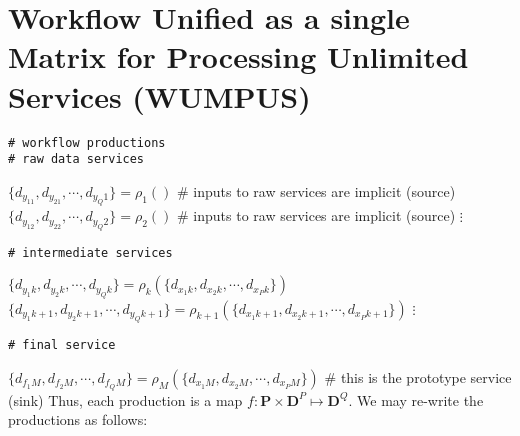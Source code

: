 \documentclass{article}[11pt]
\begin{document}
\section{Workflow Unified as a single Matrix for Processing Unlimited Services (WUMPUS)}
%
%
\begin{verbatim}
# workflow productions
# raw data services
\end{verbatim}
$\{d_{y_11}, d_{y_21}, \cdots, d_{y_Q1}\} = \rho_{1}\left(\right)$ \# inputs to raw services are implicit (source)
\newline
$\{d_{y_12}, d_{y_22}, \cdots, d_{y_Q2}\} = \rho_{2}\left(\right)$ \# inputs to raw services are implicit (source)
\newline
$\vdots$
\begin{verbatim}
# intermediate services
\end{verbatim}
$\{d_{y_1k}, d_{y_2k}, \cdots, d_{y_Qk}\} = \rho_{k}\left(\{d_{x_1k}, d_{x_2k}, \cdots, d_{x_Pk}\}\right)$ 
\newline
$\{d_{y_1k+1}, d_{y_2k+1}, \cdots, d_{y_Qk+1}\} = \rho_{k+1}\left(\{d_{x_1k+1}, d_{x_2k+1}, \cdots, d_{x_Pk+1}\}\right)$ 
\newline
$\vdots$
\begin{verbatim}
# final service
\end{verbatim}
$\{d_{f_1M}, d_{f_2M}, \cdots, d_{f_QM}\} = \rho_{M}\left(\{d_{x_1M}, d_{x_2M}, \cdots, d_{x_PM}\}\right)$ \# this is the prototype service (sink)
\newline
%
Thus, each production is a map $f \colon \mathbf{P} \times \mathbf{D}^P \mapsto \mathbf{D}^Q$.  We may re-write the productions as follows:
\end{document}
